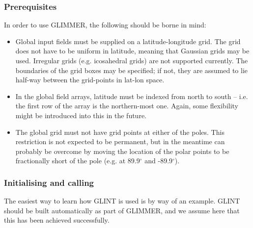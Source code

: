 \subsubsection{Prerequisites}
%
In order to use GLIMMER, the following should be borne in mind:
%
\begin{itemize}
\item Global input fields must be supplied on a latitude-longitude
  grid. The grid does not have to be uniform in latitude, meaning that
  Gaussian grids may be used. Irregular grids (e.g. icosahedral grids) are not
  supported currently. The boundaries of the grid boxes may be specified; if
  not, they are assumed to lie half-way between the grid-points in lat-lon space.
\item In the global field arrays, latitude must be indexed from north to south
  -- i.e. the first row of the array is the northern-most one. Again, some
  flexibility might be introduced into this in the future.
\item The global grid must not have grid points at either of the
  poles. This restriction is not expected to be permanent, but in the meantime
  can probably be overcome by moving the location of the polar points to be
  fractionally short of the pole (e.g. at 89.9$^{\circ}$ and -89.9$^{\circ}$).
\end{itemize}
%
\subsubsection{Initialising and calling}

The easiest way to learn how GLINT is used is by way of an
example. GLINT should be built automatically as part of GLIMMER, and we assume
here that this has been achieved successfully.

